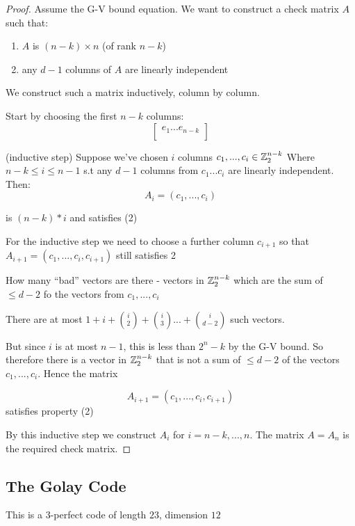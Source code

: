 \documentclass[]{amsart}
\theoremstyle{definition}
\theoremstyle{remark}
\numberwithin{equation}{section}
\begin{document}
\begin{proof}
	Assume the G-V bound equation. We want to construct a check matrix $A$ such that:\tabularnewline
	\begin{enumerate}
		\item $A$ is $(n-k) \times n$ (of rank $n-k$)
		\item any $d-1$ columns of $A$ are linearly independent
	\end{enumerate}
	We construct such a matrix inductively, column by column.

	Start by choosing the first $n-k$ columns:
	\[
		\begin{bmatrix}
		e_1 ... e_{n-k}\\
		\end{bmatrix}
	\]

	(inductive step)
	Suppose we've chosen $i$ columns $c_1, ..., c_i \in \mathbb{Z}_2^{n-k}$ \tabularnewline
	Where $n-k \leq i \leq n-1$ s.t any $d-1$ columns from $c_1 ... c_i$ are linearly independent. \tabularnewline
	Then:
	\[
		A_i = (c_1, ... , c_i)
	\]

	is $(n-k)*i$ and satisfies (2)

	For the inductive step we need to choose a further column $c_{i+1}$ so that $A_{i+1} = (c_1, ..., c_i, c_{i+1})$ still satisfies 2

	How many ``bad'' vectors are there - vectors in $\mathbb{Z}_2^{n-k}$ which are the sum of $\leq d-2$ fo the vectors from $c_1, ... , c_i$

	There are at most $1 + i  + {i \choose 2} + {i \choose 3} ... + {i \choose d-2}$ such vectors.

	But since $i$ is at most $n-1$, this is less than $2^n-k$ by the G-V bound. So therefore there is a vector in $\mathbb{Z}_2^{n-k}$ that is not a sum of $\leq d-2$ of the vectors $c_1, ..., c_i$. Hence the matrix

	\[
		A_{i+1} = (c_1, ..., c_i, c_{i+1})
	\]
	satisfies property (2)

	By this inductive step we construct $A_i$ for $i = n-k, ..., n$. The matrix $A = A_n$ is the required check matrix.	
\end{proof}

\subsection{The Golay Code}
This is a 3-perfect code of length $23$, dimension $12$
\end{document}
